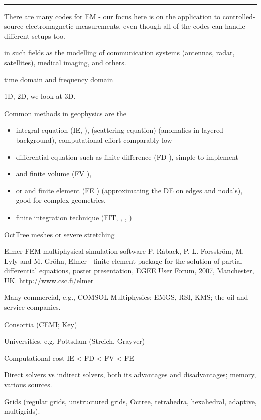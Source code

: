 \documentclass[
    paper,
  ]{geophysics}
\begin{document}
~\\ \hrule


There are many codes for EM - our focus here is on the application to
controlled-source electromagnetic measurements, even though all of the codes
can handle different setups too.

in such fields as the modelling of communication systems (antennas, radar,
satellites), medical imaging, and others.

time domain and frequency domain

1D, 2D, we look at 3D.


Common methods in geophysics are the

\begin{itemize}
  \item integral equation (IE, \cite{GJI.74.Raiche, GEO.06.Zhdanov,
    CAG.16.Kruglyakov}), (scattering equation) (anomalies in layered
    background), computational effort comparably low
  \item differential equation such as finite difference (FD \cite{IEEE.66.Yee,
    GEO.93.Wang}), simple to implement
  \item and finite volume (FV \cite{EM.90.Madsen, GEO.14.Jahandari}),
  \item or and finite element (FE \cite{GEO.04.Commer GEO.09.Streich})
    (approximating the DE on edges and nodals), good for complex geometries,
  \item finite integration technique (FIT, \cite{AEU.77.Weiland},
    \cite{PIER.01.Clemens}, \cite{GP.06.Mulder})
\end{itemize}

OctTree meshes or severe stretching \citep{ECP.07.Haber}


Elmer FEM multiphysical simulation software P. Råback, P.-L. Forsström, M. Lyly
and M. Gröhn, Elmer - finite element package for the solution of partial
differential equations, poster presentation, EGEE User Forum, 2007, Manchester,
UK. http://www.csc.fi/elmer


Many commercial, e.g., COMSOL Multiphysics; EMGS, RSI, KMS; the oil and service
companies.

Consortia (CEMI; Key)

Universities, e.g. Pottsdam (Streich, Grayver)

Computational cost IE < FD < FV < FE

Direct solvers vs indirect solvers, both its advantages and disadvantages;
memory, various sources.

Grids (regular grids, unstructured grids, Octree, tetrahedra, hexahedral,
adaptive, multigrids).
\end{document}
